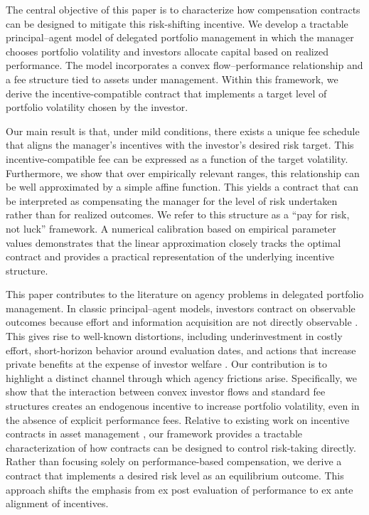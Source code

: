 The central objective of this paper is to characterize how compensation contracts can be designed to mitigate this risk-shifting incentive. We develop a tractable principal--agent model of delegated portfolio management in which the manager chooses portfolio volatility and investors allocate capital based on realized performance. The model incorporates a convex flow--performance relationship and a fee structure tied to assets under management. Within this framework, we derive the incentive-compatible contract that implements a target level of portfolio volatility chosen by the investor.

Our main result is that, under mild conditions, there exists a unique fee schedule that aligns the manager's incentives with the investor's desired risk target. This incentive-compatible fee can be expressed as a function of the target volatility. Furthermore, we show that over empirically relevant ranges, this relationship can be well approximated by a simple affine function. This yields a contract that can be interpreted as compensating the manager for the level of risk undertaken rather than for realized outcomes. We refer to this structure as a ``pay for risk, not luck'' framework. A numerical calibration based on empirical parameter values demonstrates that the linear approximation closely tracks the optimal contract and provides a practical representation of the underlying incentive structure.

This paper contributes to the literature on agency problems in delegated portfolio management. In classic principal--agent models, investors contract on observable outcomes because effort and information acquisition are not directly observable \citep{Holmstrom1979, AdmatiPfleiderer1997}. This gives rise to well-known distortions, including underinvestment in costly effort, short-horizon behavior around evaluation dates, and actions that increase private benefits at the expense of investor welfare \citep{JensenMeckling1976, Musto1999, CarhartKanielMustoReed2002}. Our contribution is to highlight a distinct channel through which agency frictions arise. Specifically, we show that the interaction between convex investor flows and standard fee structures creates an endogenous incentive to increase portfolio volatility, even in the absence of explicit performance fees. Relative to existing work on incentive contracts in asset management \citep{Starks1987, AdmatiPfleiderer1997, HolmstromMilgrom1987}, our framework provides a tractable characterization of how contracts can be designed to control risk-taking directly. Rather than focusing solely on performance-based compensation, we derive a contract that implements a desired risk level as an equilibrium outcome. This approach shifts the emphasis from ex post evaluation of performance to ex ante alignment of incentives.

